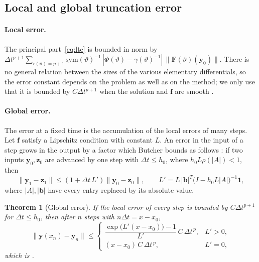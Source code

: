 \documentclass[11pt,a4paper]{article}
\newcommand{\Dt}{\Delta t}
\newcommand{\bfy}{\mathbf{y}}
\newcommand{\bff}{\mathbf{f}}
\newtheorem{theorem}{Theorem}[section]
\begin{document}
\subsection{Local and global truncation error}\label{sec:globalerr}

\paragraph{Local error.} The principal part~\eqref{eq:lte} is bounded in norm by
$\Dt^{p+1}\sum_{r(\vartheta)=p+1}\mathrm{sym}(\vartheta)^{-1}\,|\Phi(\vartheta)-\gamma(\vartheta)^{-1}|\,\|\mathbf F(\vartheta)(\bfy_0)\|$.
There is no general relation between the sizes of the various elementary differentials, so the error constant
depends on the problem as well as on the method; we only use that it is bounded by $C\Dt^{p+1}$ when the
solution and $\bff$ are smooth \cite[Sect.~318]{butcher2008}.

\paragraph{Global error.} The error at a fixed time is the accumulation of the local errors of many steps.
Let $\bff$ satisfy a Lipschitz condition with constant $L$. An error in the input of a step grows in the
output by a factor which Butcher bounds as follows \cite[Lemma~319A]{butcher2008}: if two inputs $\bfy_0,\mathbf z_0$ are
advanced by one step with $\Dt\le h_0$, where $h_0L\rho(|A|)<1$, then
\begin{equation}
\|\bfy_1-\mathbf z_1\|\le(1+\Dt\,L')\|\bfy_0-\mathbf z_0\|,\qquad
L'=L\,|\mathbf b|^{T}\bigl(I-h_0L|A|\bigr)^{-1}\mathbf 1,
\end{equation}
where $|A|,|\mathbf b|$ have every entry replaced by its absolute value.

\begin{theorem}[Global error]\label{thm:global}
If the local error of every step is bounded by $C\Dt^{p+1}$ for $\Dt\le h_0$, then after $n$ steps with
$n\Dt=x-x_0$,
\begin{equation}
\|\bfy(x_n)-\bfy_n\|\le
\begin{cases}\dfrac{\exp\bigl(L'(x-x_0)\bigr)-1}{L'}\,C\,\Dt^{\,p}, & L'>0,\\[2mm]
(x-x_0)\,C\,\Dt^{\,p}, & L'=0,\end{cases}
\end{equation}
which is \cite[Thm.~319B]{butcher2008}.
\end{theorem}
\end{document}
